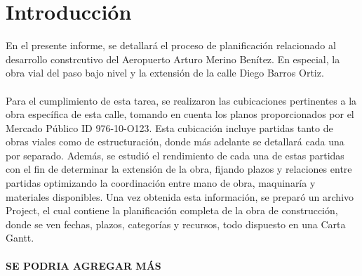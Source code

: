\section{Introducción}

En el presente informe, se detallará el proceso de planificación relacionado al desarrollo constrcutivo del Aeropuerto Arturo Merino Benítez. En especial, la obra vial del paso bajo nivel y la extensión de la calle Diego Barros Ortiz.
\\\\
Para el cumplimiento de esta tarea, se realizaron las cubicaciones pertinentes a la obra específica de esta calle, tomando en cuenta los planos proporcionados por el Mercado Público ID 976-10-O123. Esta cubicación incluye partidas tanto de obras viales como de estructuración, donde más adelante se detallará cada una por separado. Además, se estudió el rendimiento de cada una de estas partidas con el fin de determinar la extensión de la obra, fijando plazos y relaciones entre partidas optimizando la coordinación entre mano de obra, maquinaría y materiales disponibles. Una vez obtenida esta información, se preparó un archivo Project, el cual contiene la planificación completa de la obra de construcción, donde se ven fechas, plazos, categorías y recursos, todo dispuesto en una Carta Gantt.
\\\\
\textbf{SE PODRIA AGREGAR MÁS}





